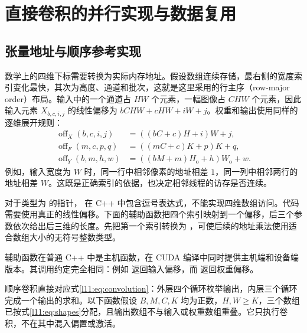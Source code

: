 \section{直接卷积的并行实现与数据复用}
\label{l11:sec:direct}

\subsection{张量地址与顺序参考实现}
\label{l11:subsec:layout}

数学上的四维下标需要转换为实际内存地址。假设数组连续存储，最右侧的宽度索引变化最快，其次为高度、通道和批次，这就是这里采用的行主序（row-major order）布局。输入中的一个通道占 $HW$ 个元素，一幅图像占 $CHW$ 个元素，因此输入元素 $X_{b,c,i,j}$ 的线性偏移为 $bCHW+cHW+iW+j$。权重和输出使用同样的逐维展开规则：
\begin{equation}
\begin{aligned}
  \operatorname{off}_X(b,c,i,j)&=((bC+c)H+i)W+j,\\
  \operatorname{off}_F(m,c,p,q)&=((mC+c)K+p)K+q,\\
  \operatorname{off}_Y(b,m,h,w)&=((bM+m)H_{\mathrm{o}}+h)W_{\mathrm{o}}+w.
\end{aligned}
\label{l11:eq:offsets}
\end{equation}
例如，输入宽度为 $W$ 时，同一行中相邻像素的地址相差 $1$，同一列中相邻两行的地址相差 $W$。这既是正确索引的依据，也决定相邻线程的访存是否连续。

对于类型为  的指针， 在 C++ 中包含逗号表达式，不能实现四维数组访问。代码需要使用真正的线性偏移。下面的辅助函数把四个索引映射到一个偏移，后三个参数依次给出后三维的长度。先把第一个索引转换为 ，可使后续的地址乘法使用适合数组大小的无符号整数类型。

\noindent\begin{minipage}{\linewidth}

\end{minipage}

辅助函数在普通 C++ 中是主机函数，在 CUDA 编译中同时提供主机端和设备端版本。其调用约定完全相同：例如  返回输入偏移，而  返回权重偏移。

顺序卷积直接对应式\eqref{l11:eq:convolution}：外层四个循环枚举输出，内层三个循环完成一个输出的求和。以下函数假设 $B,M,C,K$ 均为正数，$H,W\ge K$，三个数组已按式\eqref{l11:eq:shapes}分配，且输出数组不与输入或权重数组重叠。它只执行卷积，不在其中混入偏置或激活。

